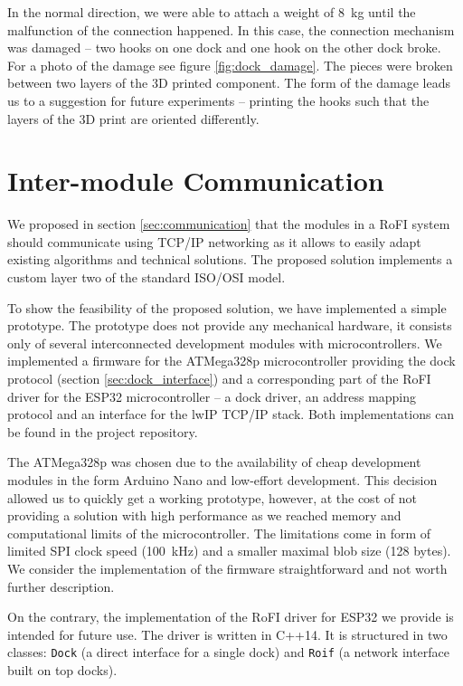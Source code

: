 In the normal direction, we were able to attach a weight of 8~kg until the
malfunction of the connection happened. In this case, the connection mechanism
was damaged -- two hooks on one dock and one hook on the other dock broke. For a
photo of the damage see figure \ref{fig:dock_damage}. The pieces were broken
between two layers of the 3D printed component. The form of the damage leads us
to a suggestion for future experiments -- printing the hooks such that the
layers of the 3D print are oriented differently.


\section{Inter-module Communication}

We proposed in section \ref{sec:communication} that the modules in a RoFI system
should communicate using TCP/IP networking as it allows to easily adapt
existing algorithms and technical solutions. The proposed solution implements a
custom layer two of the standard ISO/OSI model.

To show the feasibility of the proposed solution, we have implemented a simple
prototype. The prototype does not provide any mechanical hardware, it consists
only of several interconnected development modules with microcontrollers. We
implemented a firmware for the ATMega328p microcontroller providing the dock
protocol (section \ref{sec:dock_interface}) and a corresponding part of the RoFI
driver for the ESP32 microcontroller -- a dock driver, an address mapping
protocol and an interface for the lwIP TCP/IP stack. Both implementations can be
found in the project repository.

The ATMega328p was chosen due to the availability of cheap development modules
in the form Arduino Nano and low-effort development. This decision allowed us to
quickly get a working prototype, however, at the cost of not providing a
solution with high performance as we reached memory and computational limits of
the microcontroller. The limitations come in form of limited SPI clock speed
(100~kHz) and a smaller maximal blob size (128 bytes). We consider the
implementation of the firmware straightforward and not worth further
description.

On the contrary, the implementation of the RoFI driver for ESP32 we provide is
intended for future use. The driver is written in C++14. It is structured in two
classes: \texttt{Dock} (a direct interface for a single dock) and \texttt{Roif}
(a network interface built on top docks).

